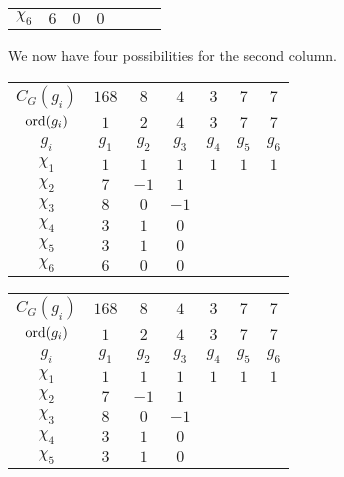 \begin{boxexample}[Constructing the Character Table of $G = \PSL{2, 7}$]
\begin{table}[H]
\begin{tabular}{|c|cccccc|}
            $\chi_6$ & $6$ & $0$ & $0$ & & & \\
        \end{tabular}
    \end{table}
    We now have four possibilities for the second column. %
    \begin{table}[H]
        \centering
        \begin{subtable}{0.45\linewidth}
            \begin{tabular}{|c|cccccc|}
                $C_G(g_i)$ & $168$ & $8$ & $4$ & $3$ & $7$ & $7$ \\
                $\operatorname{ord}\!\left( g_i \right)$ & $1$ & $2$ & $4$ & $3$ & $7$ & $7$ \\
                $g_i$ & $g_1$ & $g_2$ & $g_3$ & $g_4$ & $g_5$ & $g_6$ \\
                \hline
                $\chi_1$ & $1$ & $1$ & $1$ & $1$ & $1$ & $1$ \\
                $\chi_2$ & $7$ & $-1$ & $1$ & & & \\
                $\chi_3$ & $8$ & $0$ & $-1$ & & & \\
                $\chi_4$ & $3$ & $1$ & $0$ & & & \\
                $\chi_5$ & $3$ & $1$ & $0$ & & & \\
                $\chi_6$ & $6$ & $0$ & $0$ & & & \\
            \end{tabular}
        \end{subtable}
        \begin{subtable}{0.45\linewidth}
            \begin{tabular}{|c|cccccc|}
                $C_G(g_i)$ & $168$ & $8$ & $4$ & $3$ & $7$ & $7$ \\
                $\operatorname{ord}\!\left( g_i \right)$ & $1$ & $2$ & $4$ & $3$ & $7$ & $7$ \\
                $g_i$ & $g_1$ & $g_2$ & $g_3$ & $g_4$ & $g_5$ & $g_6$ \\
                \hline
                $\chi_1$ & $1$ & $1$ & $1$ & $1$ & $1$ & $1$ \\
                $\chi_2$ & $7$ & $-1$ & $1$ & & & \\
                $\chi_3$ & $8$ & $0$ & $-1$ & & & \\
                $\chi_4$ & $3$ & $1$ & $0$ & & & \\
                $\chi_5$ & $3$ & $1$ & $0$ & & & \\

\end{tabular}
\end{subtable}
\end{table}
\end{boxexample}
